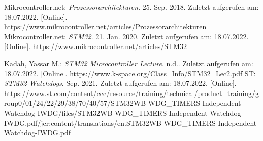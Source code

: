 \documentclass[a4paper,
DIV=13,
12pt,
BCOR=10mm,
department=FakIM,
oneside,
parskip=half,
automark,
listof=totocnumbered,
bibliography=totocnumbered,
acronym=totocnumbered
] {OTHRartcl}
\begin{document}
\begin{appendix}
\begin{thebibliography}{99}
 Mikrocontroller.net: \textit{Prozessorarchitekturen}. 25. Sep. 2018. Zuletzt aufgerufen am: 18.07.2022. [Online]. https://www.mikrocontroller.net/articles/Prozessorarchitekturen
 Mikrocontroller.net: \textit{STM32}. 21. Jan. 2020. Zuletzt aufgerufen am: 18.07.2022. [Online]. https://www.mikrocontroller.net/articles/STM32

 Kadah, Yassar M.: \textit{STM32 Microcontroller Lecture}. n.d.. Zuletzt aufgerufen am: 18.07.2022. [Online]. https://www.k-space.org/Class\_Info/STM32\_Lec2.pdf
 ST: \textit{STM32 Watchdogs}. Sep. 2021. Zuletzt aufgerufen am: 18.07.2022. [Online]. https://www.st.com/content/ccc/resource/training/technical/product\_training/group0/01/24/22/29/38/70/40/57/STM32WB-WDG\_TIMERS-Independent-Watchdog-IWDG/files/STM32WB-WDG\_TIMERS-Independent-Watchdog-IWDG.pdf/jcr:content/translations/en.STM32WB-WDG\_TIMERS-Independent-Watchdog-IWDG.pdf
\end{thebibliography}

\cleardoublepage
\makedeclaration
\end{appendix}
\end{document}
